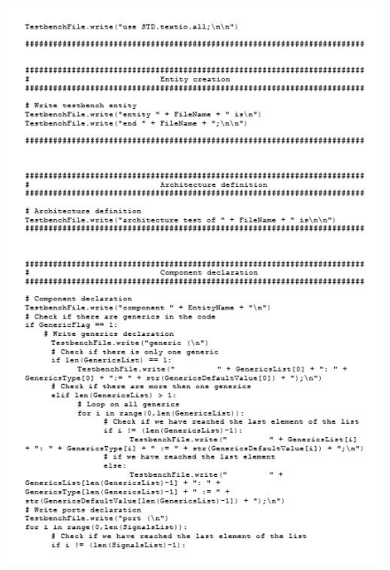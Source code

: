 \begin{figure}[!htb]
	\centering
	\includegraphics[scale=1.2]{immagini/tbgen3}
	\label{tbgen3}
\end{figure}
